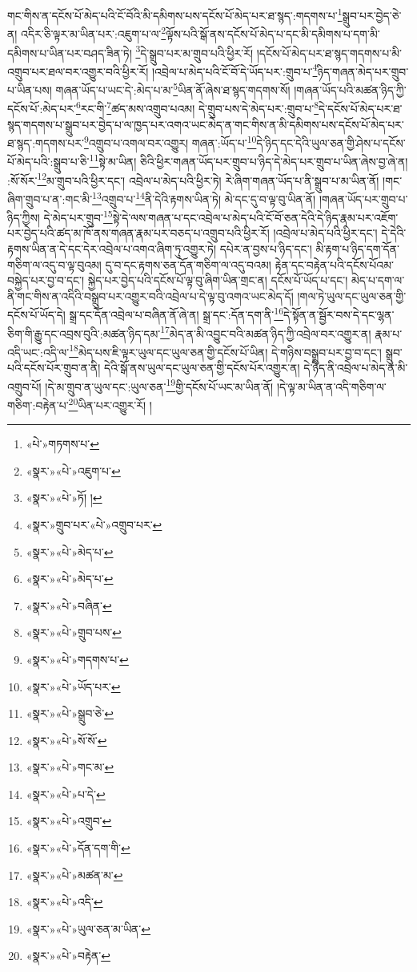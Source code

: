 གང་གིས་ན་དངོས་པོ་མེད་པའི་ངོ་བོའི་མི་དམིགས་པས་དངོས་པོ་མེད་པར་ཐ་སྙད་:གདགས་པ་\footnote{«པེ་»གཏགས་པ་}སྒྲུབ་པར་བྱེད་ཅེ་ན། འདིར་ཅི་ལྟར་མ་ཡིན་པར་:འཇུག་པ་ལ་\footnote{«སྣར་»«པེ་»འཇུག་པ་}ལྟོས་པའི་སྒོ་ནས་དངོས་པོ་མེད་པ་དང་མི་དམིགས་པ་དག་མི་དམིགས་པ་ཡིན་པར་བཤད་ཟིན་ཏེ། \footnote{«སྣར་»«པེ་»ཏོ། ། }དེ་སྒྲུབ་པར་མ་གྲུབ་པའི་ཕྱིར་རོ། །དངོས་པོ་མེད་པར་ཐ་སྙད་གདགས་པ་མི་འགྲུབ་པར་ཐལ་བར་འགྱུར་བའི་ཕྱིར་རོ། །འབྲེལ་པ་མེད་པའི་ངོ་བོ་དེ་ཡོད་པར་:གྲུབ་པ་\footnote{«སྣར་»གྲུབ་པར་«པེ་»འགྲུབ་པར་}ཉིད་གཞན་མེད་པར་གྲུབ་པ་ཡིན་པས། གཞན་ཡོད་པ་ཡང་དེ་:མེད་པ་མ་\footnote{«སྣར་»«པེ་»མེད་པ་}ཡིན་ནོ་ཞེས་ཐ་སྙད་གདགས་སོ། །གཞན་ཡོད་པའི་མཚན་ཉིད་ཀྱི་དངོས་པོ་:མེད་པར་\footnote{«སྣར་»«པེ་»མེད་པ་}རང་གི་\footnote{«སྣར་»«པེ་»བཞིན་}ཚད་མས་འགྲུབ་པའམ། དེ་གྲུབ་པས་དེ་མེད་པར་:གྲུབ་པ་\footnote{«སྣར་»«པེ་»གྲུབ་པས་}དེ་དངོས་པོ་མེད་པར་ཐ་སྙད་གདགས་པ་སྒྲུབ་པར་བྱེད་པ་ལ་ཁྱད་པར་འགའ་ཡང་མེད་ན་གང་གིས་ན་མི་དམིགས་པས་དངོས་པོ་མེད་པར་ཐ་སྙད་:གདགས་པར་\footnote{«སྣར་»«པེ་»གདགས་པ་}འགྲུབ་པ་འགལ་བར་འགྱུར། གཞན་:ཡོད་པ་\footnote{«སྣར་»«པེ་»ཡོད་པར་}དེ་ཉིད་དང་དེའི་ཡུལ་ཅན་གྱི་ཤེས་པ་དངོས་པོ་མེད་པའི་:སྒྲུབ་པ་ཅི་\footnote{«སྣར་»«པེ་»སྒྲུབ་ཅེ་}སྟེ་མ་ཡིན། ཅིའི་ཕྱིར་གཞན་ཡོད་པར་གྲུབ་པ་ཉིད་དེ་མེད་པར་གྲུབ་པ་ཡིན་ཞེས་བྱ་ཞེ་ན། :སོ་སོར་\footnote{«སྣར་»«པེ་»སོ་སོ་}མ་གྲུབ་པའི་ཕྱིར་དང་། འབྲེལ་པ་མེད་པའི་ཕྱིར་ཏེ། རེ་ཞིག་གཞན་ཡོད་པ་ནི་སྒྲུབ་པ་མ་ཡིན་ནོ། །གང་ཞིག་གྲུབ་པ་ན་:གང་མི་\footnote{«སྣར་»«པེ་»གང་མ་}འགྲུབ་པ་\footnote{«སྣར་»«པེ་»པ་དེ་}ནི་དེའི་རྟགས་ཡིན་ཏེ། མེ་དང་དུ་བ་ལྟ་བུ་ཡིན་ནོ། །གཞན་ཡོད་པར་གྲུབ་པ་ཉིད་ཀྱིས། དེ་མེད་པར་གྲུབ་\footnote{«སྣར་»«པེ་»འགྲུབ་}སྟེ་དེ་ལས་གཞན་པ་དང་འབྲེལ་པ་མེད་པའི་ངོ་བོ་ཅན་དེའི་དེ་ཉིད་རྣམ་པར་འཇོག་པར་བྱེད་པའི་ཚད་མ་ཁོ་ནས་གཞན་རྣམ་པར་བཅད་པ་འགྲུབ་པའི་ཕྱིར་རོ། །འབྲེལ་པ་མེད་པའི་ཕྱིར་དང་། དེ་དེའི་རྟགས་ཡིན་ན་དེ་དང་དེར་འབྲེལ་པ་འགའ་ཞིག་ཏུ་འགྱུར་ཏེ། དཔེར་ན་བྱས་པ་ཉིད་དང་། མི་རྟག་པ་ཉིད་དག་དོན་གཅིག་ལ་འདུ་བ་ལྟ་བུའམ། དུ་བ་དང་རྟགས་ཅན་དོན་གཅིག་ལ་འདུ་བའམ། རྟེན་དང་བརྟེན་པའི་དངོས་པོའམ་བསྐྱེད་པར་བྱ་བ་དང་། སྐྱེད་པར་བྱེད་པའི་དངོས་པོ་ལྟ་བུ་ཞིག་ཡིན་གྲང་ན། དངོས་པོ་ཡོད་པ་དང་། མེད་པ་དག་ལ་ནི་གང་གིས་ན་འདིའི་བསྒྲུབ་པར་འགྱུར་བའི་འབྲེལ་པ་དེ་ལྟ་བུ་འགའ་ཡང་མེད་དོ། །གལ་ཏེ་ཡུལ་དང་ཡུལ་ཅན་གྱི་དངོས་པོ་ཡོད་དེ། སྒྲ་དང་དོན་འབྲེལ་པ་བཞིན་ནོ་ཞེ་ན། སྒྲ་དང་:དོན་དག་ནི་\footnote{«སྣར་»«པེ་»དོན་དག་གི་}དེ་སྟོན་ན་སྦྱོར་བས་དེ་དང་ལྷན་ཅིག་གི་རྒྱུ་དང་འབྲས་བུའི་:མཚན་ཉིད་དམ་\footnote{«སྣར་»«པེ་»མཚན་མ་}མེད་ན་མི་འབྱུང་བའི་མཚན་ཉིད་ཀྱི་འབྲེལ་བར་འགྱུར་ན། རྣམ་པ་འདི་ཡང་:འདི་ལ་\footnote{«སྣར་»«པེ་»འདི་}མེད་པས་ཇི་ལྟར་ཡུལ་དང་ཡུལ་ཅན་གྱི་དངོས་པོ་ཡིན། དེ་གཉིས་བསྒྲུབ་པར་བྱ་བ་དང་། སྒྲུབ་པའི་དངོས་པོར་གྲུབ་ན་ནི། དེའི་སྒོ་ནས་ཡུལ་དང་ཡུལ་ཅན་གྱི་དངོས་པོར་འགྱུར་ན། དེ་ཉིད་ནི་འབྲེལ་པ་མེད་ན་མི་འགྲུབ་པོ། །དེ་མ་གྲུབ་ན་ཡུལ་དང་:ཡུལ་ཅན་\footnote{«སྣར་»«པེ་»ཡུལ་ཅན་མ་ཡིན་}གྱི་དངོས་པོ་ཡང་མ་ཡིན་ནོ། །དེ་ལྟ་མ་ཡིན་ན་འདི་གཅིག་ལ་གཅིག་:བརྟེན་པ་\footnote{«སྣར་»«པེ་»བརྟེན་}ཡིན་པར་འགྱུར་རོ། །
